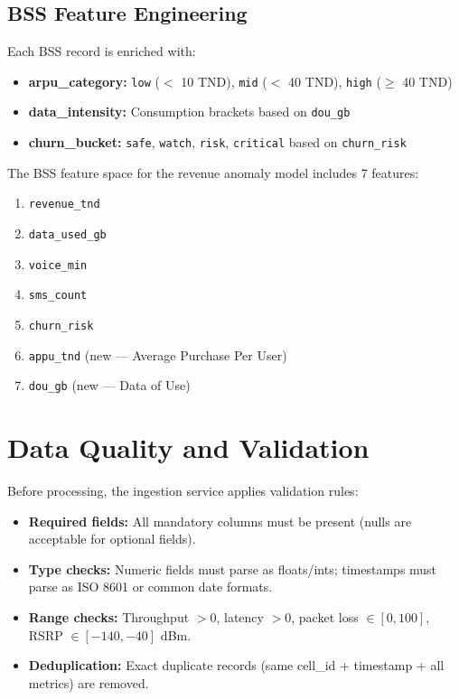 \subsection{BSS Feature Engineering}

Each BSS record is enriched with:

\begin{itemize}
  \item \textbf{arpu\_category:} \texttt{low} ($<$ 10 TND), \texttt{mid} ($<$ 40 TND), \texttt{high} ($\geq$ 40 TND)
  \item \textbf{data\_intensity:} Consumption brackets based on \texttt{dou\_gb}
  \item \textbf{churn\_bucket:} \texttt{safe}, \texttt{watch}, \texttt{risk}, \texttt{critical} based on \texttt{churn\_risk}
\end{itemize}

The BSS feature space for the revenue anomaly model includes 7 features:
\begin{enumerate}
  \item \texttt{revenue\_tnd}
  \item \texttt{data\_used\_gb}
  \item \texttt{voice\_min}
  \item \texttt{sms\_count}
  \item \texttt{churn\_risk}
  \item \texttt{appu\_tnd} (new --- Average Purchase Per User)
  \item \texttt{dou\_gb} (new --- Data of Use)
\end{enumerate}

\section{Data Quality and Validation}

Before processing, the ingestion service applies validation rules:

\begin{itemize}
  \item \textbf{Required fields:} All mandatory columns must be present (nulls are acceptable for optional fields).
  \item \textbf{Type checks:} Numeric fields must parse as floats/ints; timestamps must parse as ISO 8601 or common date formats.
  \item \textbf{Range checks:} Throughput $> 0$, latency $> 0$, packet loss $\in [0, 100]$, RSRP $\in [-140, -40]$ dBm.
  \item \textbf{Deduplication:} Exact duplicate records (same cell\_id + timestamp + all metrics) are removed.
\end{itemize}

